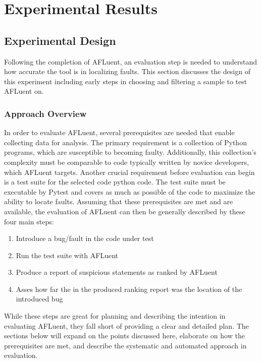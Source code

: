 \chapter{Experimental Results}
\label{ch:experiments}

\section{Experimental Design}
\label{sec:expiremental_design}

Following the completion of AFLuent, an evaluation step is needed to understand
how accurate the tool is in localizing faults. This section discusses the design
of this experiment including early steps in choosing and filtering a sample to
test AFLuent on.

\subsection{Approach Overview}
\label{subsec:approach_overview}

In order to evaluate AFLuent, several prerequisites are needed that enable
collecting data for analysis. The primary requirement is a collection of Python
programs, which are susceptible to becoming faulty. Additionally, this
collection's complexity must be comparable to code typically written by novice
developers, which AFLuent targets. Another crucial requirement before evaluation
can begin is a test suite for the selected code python code. The test suite must
be executable by Pytest and covers as much as possible of the code to
maximize the ability to locate faults. Assuming that these prerequisites are
met and are available, the evaluation of AFLuent can then be generally described
by these four main steps:

\begin{enumerate}
    \item Introduce a bug/fault in the code under test
    \item Run the test suite with AFLuent
    \item Produce a report of suspicious statements as ranked by AFLuent
    \item Asses how far the in the produced ranking report was the location of
    the introduced bug
\end{enumerate}

While these steps are great for planning and describing the intention in evaluating
AFLuent, they fall short of providing a clear and detailed plan. The sections
below will expand on the points discussed here, elaborate on how the
prerequisites are met, and describe the systematic and automated approach in evaluation.

